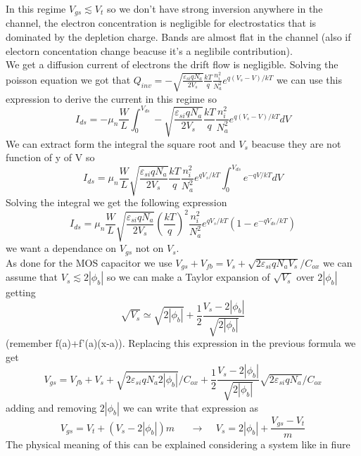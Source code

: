 In this regime $V_{gs} \lesssim V_t$ so we don't have strong inversion anywhere in the channel, the electron concentration is negligible for electrostatics that is dominated by the depletion charge. Bands are almost flat in the channel (also if electorn concentation change beacuse it's a neglibile contribution).\\
We get a diffusion current of electrons the drift flow is negligible. Solving the poisson equation we got that $Q_{inv}=-\sqrt{\frac{\varepsilon_{si}qN_a}{2V_s}}\frac{kT}{q}\frac{n_i^2}{N_a^2}e^{q(V_s-V)/kT}$ we can use this expression to derive the current in this regime so 
\begin{equation}
I_{ds}=-\mu_n \frac{W}{L}\int^{V_{ds}}_0-\sqrt{\frac{\varepsilon_{si}qN_a}{2V_s}}\frac{kT}{q}\frac{n_i^2}{N_a^2}e^{q(V_s-V)/kT}dV
\end{equation}
We can extract form the integral the square root and $V_s$ beacuse they are not function of y of V so 
\begin{equation}
I_{ds}=\mu_n \frac{W}{L}\sqrt{\frac{\varepsilon_{si}qN_a}{2V_s}}\frac{kT}{q}\frac{n_i^2}{N_a^2}e^{qV_s/kT}\int^{V_{ds}}_0e^{-qV/kT}dV
\end{equation}
Solving the integral we get the following expression
\begin{equation}
I_{ds}=\mu_n \frac{W}{L}\sqrt{\frac{\varepsilon_{si}qN_a}{2V_s}}\left(\frac{kT}{q}\right)^2\frac{n_i^2}{N_a^2}e^{qV_s/kT}\left(1-e^{-qV_{ds}/kT}\right)
\end{equation}
we want a dependance on $V_{gs}$ not on $V_s$.\\
As done for the MOS capacitor we use $V_{gs}+V_{fb}=V_s+\sqrt{2\varepsilon_{si}qN_aV_s}/C_{ox}$ we can assume that $V_s \lesssim 2|\phi_b|$ so we can make a Taylor expansion of $\sqrt{V_s}$ over $2|\phi_b|$ getting 
\begin{equation}
\sqrt{V_s}\simeq \sqrt{2|\phi_b|}+\frac{1}{2}\frac{V_{s}-2|\phi_b|}{\sqrt{2|\phi_b|}}
\end{equation}
(remember f(a)+f'(a)(x-a)). Replacing this expression in the previous formula we get 
\begin{equation}
V_{gs}=V_{fb}+V_s+\sqrt{2\varepsilon_{si}qN_a2|\phi_b|}/C_{ox}+\frac{1}{2}\frac{V_{s}-2|\phi_b|}{\sqrt{2|\phi_b|}}\sqrt{2\varepsilon_{si}qN_a}/C_{ox}
\end{equation}
adding and removing $2|\phi_b|$ we can write that expression as 
\begin{equation}
V_{gs}=V_t+(V_s-2|\phi_b|)m\ \ \ \ \ \ \ \rightarrow \ \ \ \ \ V_{s}=2|\phi_b|+\frac{V_{gs}-V_t}{m}
\end{equation}
The physical meaning of this can be explained considering a system like in fiure\\

